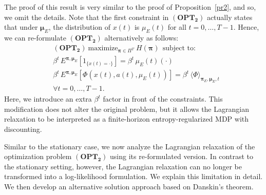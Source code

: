 \documentclass[11pt]{article}
\newcommand{\bmu}{{\boldsymbol \mu}}
\newcommand{\bpi}{{\boldsymbol \pi}}
\begin{document}
The proof of this result is very similar to the proof of Proposition~\ref{pr2}, and so, we omit the details. Note that the first constraint in $\mathbf{(OPT_2)}$ actually states that under $\bmu_E$, the distribution of $x(t)$ is $\mu_E(t)$ for all $t=0,\ldots,T-1$. Hence, we can re-formulate $\mathbf{(OPT_2)}$ alternatively as follows:
\begin{align*}
&\mathbf{(OPT_2)} \ \text{maximize}_{\bpi \in \Pi^T} \ H(\bpi) ~~ \text{subject to:} \\
& \beta^t \, E^{\bpi,\bmu_E} [1_{\{x(t) = \cdot\}}] = \beta^t \, \mu_E(t)(\cdot) \\
&\beta^t \, E^{\bpi,\bmu_E}[\Phi(x(t),a(t),\mu_E(t))] = \beta^t \, \langle \Phi \rangle_{\bpi_E,\bmu_E,t} \\
&\forall t=0,\ldots,T-1.
\end{align*}
Here, we introduce an extra \(\beta^t\) factor in front of the constraints. This modification does not alter the original problem, but it allows the Lagrangian relaxation to be interpreted as a finite-horizon entropy-regularized MDP with discounting.


Similar to the stationary case, we now analyze the Lagrangian relaxation of the optimization problem \(\mathbf{(OPT_2)}\) using its re-formulated version. In contrast to the stationary setting, however, the Lagrangian relaxation can no longer be transformed into a log-likelihood formulation. We explain this limitation in detail. We then develop an alternative solution approach based on Danskin's theorem.
\end{document}
